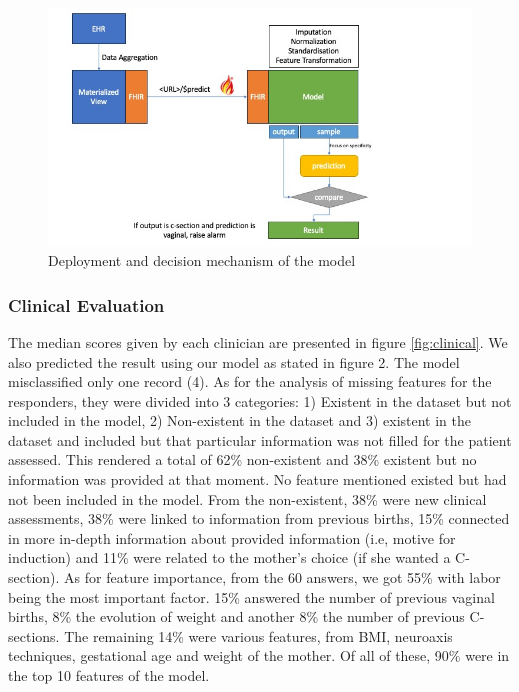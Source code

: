 
\begin{figure}[htbp]
\centering
\captionsetup{justification=centering}
\caption{Deployment and decision mechanism of the model}\label{fig:deploy} 
\includegraphics[scale=0.60]{figures/obs-model.jpg}
\end{figure}

\subsubsection{Clinical Evaluation}
The median scores given by each clinician are presented in figure \ref{fig:clinical}. We also predicted the result using our model as stated in figure 2. The model misclassified only one record (4). As for the analysis of missing features for the responders, they were divided into 3 categories: 1) Existent in the dataset but not included in the model, 2) Non-existent in the dataset and 3) existent in the dataset and included but that particular information was not filled for the patient assessed. This rendered a total of 62\% non-existent and 38\% existent but no information was provided at that moment. No feature mentioned existed but had not been included in the model. From the non-existent, 38\% were new clinical assessments, 38\% were linked to information from previous births, 15\% connected in more in-depth information about provided information (i.e, motive for induction) and 11\% were related to the mother’s choice (if she wanted a C-section). As for feature importance, from the 60 answers, we got 55\% with labor being the most important factor. 15\% answered the number of previous vaginal births, 8\% the evolution of weight and another 8\% the number of previous C-sections. The remaining 14\% were various features, from BMI, neuroaxis techniques, gestational age and weight of the mother. Of all of these, 90\% were in the top 10 features of the model.




